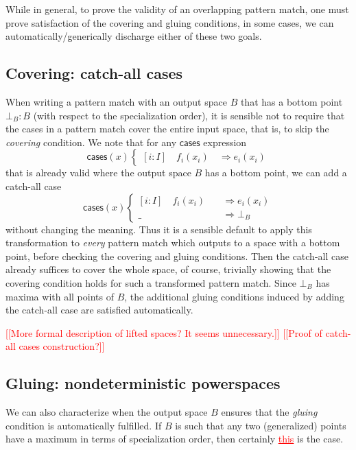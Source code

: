 \documentclass[conference]{IEEEtran}
\newcommand{\wildcard}{\_}
\newcommand{\Branch}{\Rightarrow}
\newcommand{\note}[1]{\textcolor{red}{[[{#1}]]}}
\newcommand{\grammar}[1]{\textcolor{red}{\underline{#1}}}
\begin{document}
While in general, to prove the validity of an overlapping pattern match, one must prove satisfaction of the covering and gluing conditions, in some cases, we can automatically/generically discharge either of these two goals. 

\subsection{Covering: catch-all cases}

When writing a pattern match with an output space $B$ that has a bottom point $\bot_B : B$ (with respect to the specialization order), it is sensible not to require that the cases in a pattern match cover the entire input space, that is, to skip the \emph{covering} condition. We note that for any $\mathsf{cases}$ expression
\[
\mathsf{cases}(x)
\begin{cases}
[i : I] \quad f_i(x_i) \quad \Branch e_i(x_i)
\end{cases}
\]
that is already valid where the output space $B$ has a bottom point, we can add a catch-all case
\[
\mathsf{cases}(x)
\begin{cases}
[i : I] \quad f_i(x_i) \quad &\Branch e_i(x_i)
\\ \wildcard \quad &\Branch \bot_B
\end{cases}
\]
without changing the meaning. Thus it is a sensible default to apply this transformation to \emph{every} pattern match which outputs to a space with a bottom point, before checking the covering and gluing conditions. Then the catch-all case already suffices to cover the whole space, of course, trivially showing that the covering condition holds for such a transformed pattern match. Since $\bot_B$ has maxima with all points of $B$, the additional gluing conditions induced by adding the catch-all case are satisfied automatically.

\note{More formal description of lifted spaces? It seems unnecessary.}
\note{Proof of catch-all cases construction?}

\subsection{Gluing: nondeterministic powerspaces}

We can also characterize when the output space $B$ ensures that the \emph{gluing} condition is automatically fulfilled. If $B$ is such that any two (generalized) points have a maximum in terms of specialization order, then certainly \grammar{this} is the case.
\end{document}
